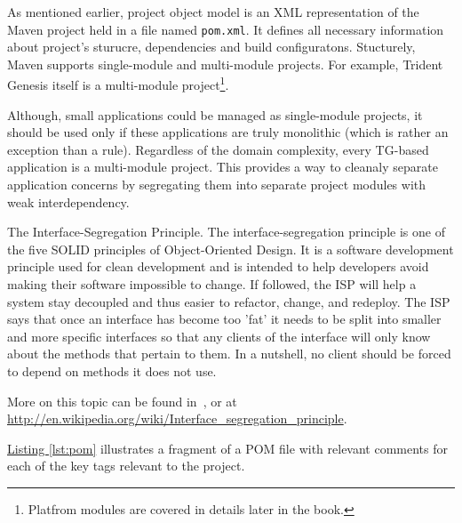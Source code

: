   As mentioned earlier, project object model is an XML representation of the Maven project held in a file named \texttt{pom.xml}. 
  It defines all necessary information about project's sturucre, dependencies and build configuratons.
  Stucturely, Maven supports single-module and multi-module projects.
  For example, Trident Genesis itself is a multi-module project\footnote{Platfrom modules are covered in details later in the book.}.

  Although, small applications could be managed as single-module projects, it should be used only if these applications are truly monolithic (which is rather an exception than a rule).  
  Regardless of the domain complexity, every TG-based application is a multi-module project.
  This provides a way to cleanaly separate application concerns by segregating them into separate project modules with weak interdependency.
  
  \begin{notebox}{The Interface-Segregation Principle.}{\label{mb:segregation}}
    The interface-segregation principle is one of the five SOLID principles of Object-Oriented Design.
    It is a software development principle used for clean development and is intended to help developers avoid making their software impossible to change. 
    If followed, the ISP will help a system stay decoupled and thus easier to refactor, change, and redeploy. 
    The ISP says that once an interface has become too 'fat' it needs to be split into smaller and more specific interfaces so that any clients of the interface will only know about the methods that pertain to them. In a nutshell, no client should be forced to depend on methods it does not use.

    More on this topic can be found in~\cite{Martin2002}, or at \url{http://en.wikipedia.org/wiki/Interface_segregation_principle}.
  \end{notebox}   

  \hyperref[lst:pom]{Listing \ref{lst:pom}} illustrates a fragment of a POM file with relevant comments for each of the key tags relevant to the project.


